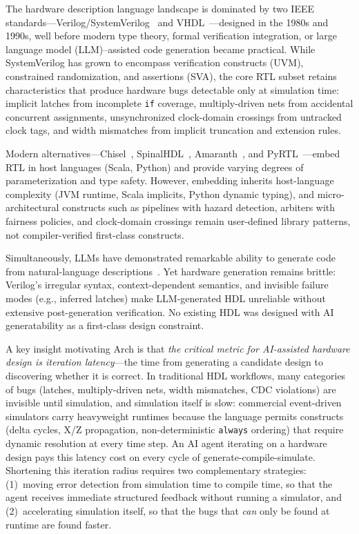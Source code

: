 \documentclass[11pt,twocolumn]{article}
\begin{document}
The hardware description language landscape is dominated by two IEEE standards---Verilog/SystemVerilog~\cite{ieee1800} and VHDL~\cite{ieee1076}---designed in the 1980s and 1990s, well before modern type theory, formal verification integration, or large language model (LLM)--assisted code generation became practical.
While SystemVerilog has grown to encompass verification constructs (UVM), constrained randomization, and assertions (SVA), the core RTL subset retains characteristics that produce hardware bugs detectable only at simulation time:
implicit latches from incomplete \texttt{if} coverage, multiply-driven nets from accidental concurrent assignments, unsynchronized clock-domain crossings from untracked clock tags, and width mismatches from implicit truncation and extension rules.

Modern alternatives---Chisel~\cite{chisel}, SpinalHDL~\cite{spinalhdl}, Amaranth~\cite{amaranth}, and PyRTL~\cite{pyrtl}---embed RTL in host languages (Scala, Python) and provide varying degrees of parameterization and type safety.
However, embedding inherits host-language complexity (JVM runtime, Scala implicits, Python dynamic typing), and micro-architectural constructs such as pipelines with hazard detection, arbiters with fairness policies, and clock-domain crossings remain user-defined library patterns, not compiler-verified first-class constructs.

Simultaneously, LLMs have demonstrated remarkable ability to generate code from natural-language descriptions~\cite{codex,copilot}.
Yet hardware generation remains brittle: Verilog's irregular syntax, context-dependent semantics, and invisible failure modes (e.g., inferred latches) make LLM-generated HDL unreliable without extensive post-generation verification.
No existing HDL was designed with AI generatability as a first-class design constraint.

A key insight motivating Arch is that \emph{the critical metric for AI-assisted hardware design is iteration latency}---the time from generating a candidate design to discovering whether it is correct. In traditional HDL workflows, many categories of bugs (latches, multiply-driven nets, width mismatches, CDC violations) are invisible until simulation, and simulation itself is slow: commercial event-driven simulators carry heavyweight runtimes because the language permits constructs (delta cycles, X/Z propagation, non-deterministic \texttt{always} ordering) that require dynamic resolution at every time step. An AI agent iterating on a hardware design pays this latency cost on every cycle of generate-compile-simulate. Shortening this iteration radius requires two complementary strategies: (1)~moving error detection from simulation time to compile time, so that the agent receives immediate structured feedback without running a simulator, and (2)~accelerating simulation itself, so that the bugs that \emph{can} only be found at runtime are found faster.
\end{document}
